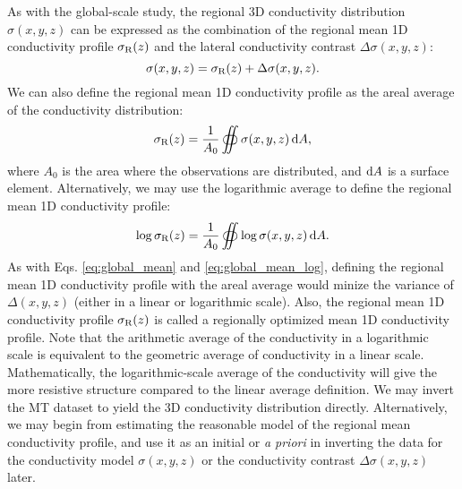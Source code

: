 	As with the global-scale study, the regional 3D conductivity distribution $\sigma(x,y,z)$ can be expressed as the combination of the regional mean 1D conductivity profile $\sigma_{\text{R}}(z)$ and the lateral conductivity contrast $\Delta\sigma(x,y,z)$:
	\begin{equation}\label{eq:global_model}
		\sigma(x,y,z) = \sigma_\Regional(z) + \Delta\sigma(x,y,z).
	\end{equation}
	We can also define the regional mean 1D conductivity profile as the areal average of the conductivity distribution:
	\begin{equation}\label{eq:regional_mean_linear}
		\sigma_\Regional(z) = \frac{1}{A_0} \oiint \sigma(x,y,z)\, \dwrt{A},
	\end{equation}
	where $A_0$ is the area where the observations are distributed, and $\mathrm{d}{A}$ is a surface element. Alternatively, 
	we may use the logarithmic average to define the regional mean 1D conductivity profile:
	\begin{equation}\label{eq:regional_mean_log}
		\log \sigma_\Regional(z) = \frac{1}{A_0} \oiint \log \sigma(x,y,z)\, \dwrt{A}.
	\end{equation}
	As with Eqs. \eqref{eq:global_mean} and \eqref{eq:global_mean_log}, defining the regional mean 1D conductivity profile with the areal average would minize the variance of $\Delta(x,y,z)$ (either in a linear or logarithmic scale). Also, the regional mean 1D conductivity profile $\sigma_{\text{R}}(z)$ is called a regionally optimized mean 1D conductivity profile.
	Note that the arithmetic average of the conductivity in a logarithmic scale is equivalent to the geometric average of conductivity in a linear scale. Mathematically, the logarithmic-scale average of the conductivity will give the more resistive structure compared to the linear average definition.
	We may invert the MT dataset to yield the 3D conductivity distribution directly.
	Alternatively, we may begin from estimating the reasonable model of the regional mean conductivity profile, and use it as an initial or \emph{a priori} in inverting the data for the conductivity model $\sigma (x,y,z)$ or the conductivity contrast $\Delta\sigma(x,y,z)$ later.

